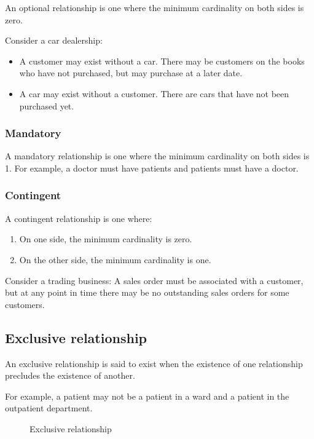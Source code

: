 \documentclass[slides]{pgnotes}
\begin{document}
An optional relationship is one where the minimum cardinality on both
sides is zero.

Consider a car dealership:

\begin{itemize}
\item
  A customer may exist without a car. There may be customers on the
  books who have not purchased, but may purchase at a later date.
\item
  A car may exist without a customer. There are cars that have not been
  purchased yet.
\end{itemize}

\subsubsection{Mandatory}\label{mandatory}

A mandatory relationship is one where the minimum cardinality on both
sides is 1. For example, a doctor must have patients and patients must
have a doctor.

\subsubsection{Contingent}\label{contingent}

A contingent relationship is one where:

\begin{enumerate}
\def\labelenumi{\arabic{enumi}.}
\item
  On one side, the minimum cardinality is zero.
\item
  On the other side, the minimum cardinality is one.
\end{enumerate}

Consider a trading business: A sales order must be associated with a
customer, but at any point in time there may be no outstanding sales
orders for some customers.

\subsection{Exclusive relationship}\label{exclusive-relationship}

An exclusive relationship is said to exist when the existence of one
relationship precludes the existence of another.

For example, a patient may not be a patient in a ward and a patient in
the outpatient department.

\begin{figure}[htbp]
  \centering
  \caption{Exclusive relationship{}}
\end{figure}
\end{document}
